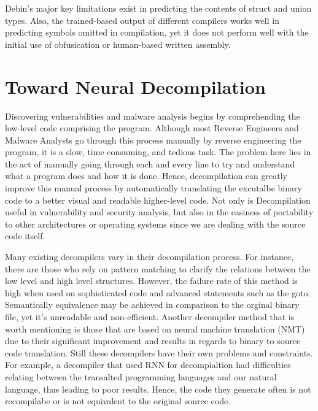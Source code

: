 \documentclass{article}
\begin{document}
Debin's major key limitations exist in predicting the contents of struct and union types. Also, the trained-based output of different compilers works well in predicting symbols omitted in compilation, yet it does not perform well with the initial use of obfusication or human-based written assembly.

\section{Toward Neural Decompilation}

Discovering vulnerabilities and malware analysis begins by comprehending the low-level code comprising the program. Although most Reverse Engineers and Malware Analysts go through this process manually by reverse engineering
the program, it is a slow, time consuming, and tedious task. The problem here lies in the act of manually going through each and every line to try and understand what a program does and how it is done.
Hence, decompilation can greatly improve this manual process by automatically translating the excutalbe binary code to a better visual and readable higher-level code. Not only is Decompilation useful in vulnerability and security analysis, but also in the
easiness of portability to other architectures or operating systems since we are dealing with the source code itself.

Many existing decompilers vary in their decompilation process. For instance, there are those who rely on pattern matching to clarify the relations between the low level and high level structures. However, the failure rate of this method is high when used on sophisticated code and advanced statements
such as the goto. Semantically equivalence may be achieved in comparison to the orginal binary file, yet it's unreadable and non-efficient. Another decompiler method that is worth mentioning is those that are based on neural machine translation (NMT) due to their significant improvement and results in regards to binary to source code translation.
Still these decompilers have their own problems and constraints. For example, a decompiler that used RNN for decompialtion had difficulties relating between the transalted programming languages and our natural language, thus leading to poor results. Hence, the code they generate often is not recompilabe or is not equivalent to the original source code.
\end{document}
